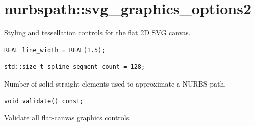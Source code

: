 \section{nurbspath::svg\_graphics\_options2}
Styling and tessellation controls for the flat 2D SVG canvas.
\par\noindent\begin{minipage}{\linewidth}
\begin{lstlisting}[style=apireference]
REAL line_width = REAL(1.5);
\end{lstlisting}
\end{minipage}\par\vspace{1pt}
\par\noindent\begin{minipage}{\linewidth}
\begin{lstlisting}[style=apireference]
std::size_t spline_segment_count = 128;
\end{lstlisting}
{\footnotesize Number of solid straight elements used to approximate a NURBS path.\par}
\end{minipage}\par\vspace{1pt}
\par\noindent\begin{minipage}{\linewidth}
\begin{lstlisting}[style=apireference]
void validate() const;
\end{lstlisting}
{\footnotesize Validate all flat-canvas graphics controls.\par}
\end{minipage}\par\vspace{1pt}
